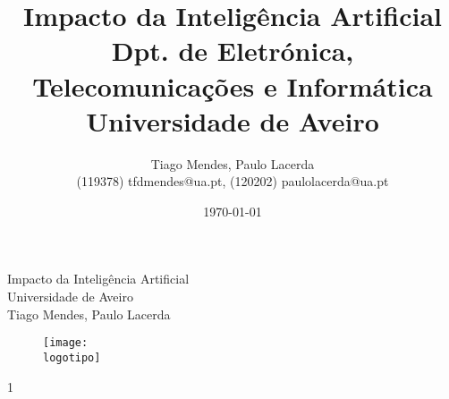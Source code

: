 \documentclass[a4paper, 11pt, onecolumn, oneside]{report}
\begin{document}
%
\def\titulo{Impacto da Inteligência Artificial}
\def\data{DATA}
\def\autores{Tiago Mendes, Paulo Lacerda}
\def\autorescontactos{(119378) tfdmendes@ua.pt, (120202) paulolacerda@ua.pt}
\def\versao{1}\def\repositorio{infor2023-ap-g-infor2023-ap-g16}
\def\departamento{Dpt. de Eletrónica, Telecomunicações e Informática}
\def\empresa{Universidade de Aveiro}
\def\logotipo{ua.pdf}
%
%
\begin{titlepage}

\begin{center}
%
\vspace*{50mm}
%
{\Huge \titulo}\\ 
%
\vspace{10mm}
%
{\Large \empresa}\\
%
\vspace{10mm}
%
{\LARGE \autores}\\ 
%
\vspace{30mm}
%
\begin{figure}[h]
\center
\texttt{[image: \\logotipo]}
\end{figure}
%
\vspace{30mm}
\end{center}
%
\begin{flushright}
\versao
\end{flushright}
\end{titlepage}

\title{%
{\Huge\textbf{\titulo}}\\
{\Large \departamento\\ \empresa}
}
%
\author{%
    \autores \\
    \autorescontactos
}
%
\date{\today}
%
\maketitle

\end{document}
